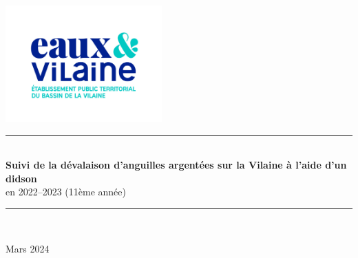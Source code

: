 \documentclass[11pt,twocolumn,titlepage,twoside]{article}
\begin{document}
\newpage
{}
\pagecolor{white}
\thispagestyle{empty}
\begin{minipage}{\textwidth}
\includegraphics[width=6cm,keepaspectratio=true]{logo_EV.jpg}
\end{minipage}

\vspace*{2cm}
\begin{minipage}{0.1\textwidth}
\phantom{This text will be invisible}
\end{minipage}
\begin{minipage}{0.8\textwidth}
\begin{center}
\noindent
{\color{turquoise_EV}\rule{\textwidth}{2.5pt}}\\
\vspace{10mm}
\color{bleu_EV}
{ \huge  \bfseries{Suivi de la dévalaison d'anguilles argentées sur la Vilaine
à l'aide d'un didson}}\\ 
\bigskip
{ \LARGE en 2022--2023 (11ème année)}

\noindent
{\color{turquoise_EV}\rule{0.9\textwidth}{1.8pt}}\\
\vspace{5mm}
{}
\end{center}
\end{minipage}
\vfill
\hfill \Large Mars 2024

\normalsize

\restoregeometry
\clearpage
\end{document}
